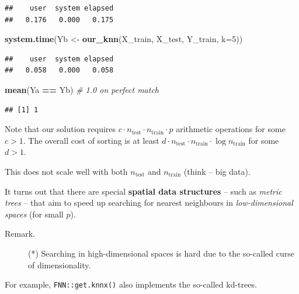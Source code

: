 \documentclass[10pt,b5paper,krantz1]{krantz}
\newenvironment{Shaded}{\begin{snugshade}}{\end{snugshade}}
\newcommand{\CommentTok}[1]{\textcolor[rgb]{0.37,0.37,0.37}{\textit{#1}}}
\newcommand{\DataTypeTok}[1]{\textcolor[rgb]{0.27,0.27,0.27}{#1}}
\newcommand{\DecValTok}[1]{\textcolor[rgb]{0.06,0.06,0.06}{#1}}
\newcommand{\KeywordTok}[1]{\textcolor[rgb]{0.27,0.27,0.27}{\textbf{#1}}}
\newcommand{\NormalTok}[1]{#1}
\newcommand{\OperatorTok}[1]{\textcolor[rgb]{0.43,0.43,0.43}{\textbf{#1}}}
\newcommand{\StringTok}[1]{\textcolor[rgb]{0.5,0.5,0.5}{#1}}
\begin{document}
\begin{verbatim}
##    user  system elapsed 
##   0.176   0.000   0.175
\end{verbatim}

\begin{Shaded}
\begin{Highlighting}[]
\KeywordTok{system.time}\NormalTok{(Yb <-}\StringTok{ }\KeywordTok{our_knn}\NormalTok{(X_train, X_test, Y_train, }\DataTypeTok{k=}\DecValTok{5}\NormalTok{))}
\end{Highlighting}
\end{Shaded}

\begin{verbatim}
##    user  system elapsed 
##   0.058   0.000   0.058
\end{verbatim}

\begin{Shaded}
\begin{Highlighting}[]
\KeywordTok{mean}\NormalTok{(Ya }\OperatorTok{==}\StringTok{ }\NormalTok{Yb) }\CommentTok{# 1.0 on perfect match}
\end{Highlighting}
\end{Shaded}

\begin{verbatim}
## [1] 1
\end{verbatim}

Note that our solution requires \(c\cdot n_\text{test}\cdot n_\text{train}\cdot p\)
arithmetic operations for some \(c>1\).
The overall cost of sorting is at least \(d\cdot n_\text{test}\cdot n_\text{train}\cdot\log n_\text{train}\)
for some \(d>1\).

This does not scale well with both \(n_\text{test}\) and \(n_\text{train}\)
(think -- big data).

\bigskip

It turns out that there are special \textbf{spatial data structures}
-- such as \emph{metric trees} -- that aim to speed up searching for nearest
neighbours in \emph{low-dimensional spaces} (for small \(p\)).

\begin{description}
\item[Remark.]
(*) Searching in high-dimensional spaces is hard due to the so-called
curse of dimensionality.
\end{description}

For example, \texttt{FNN::get.knnx()} also implements the so-called
kd-trees.
\end{document}
